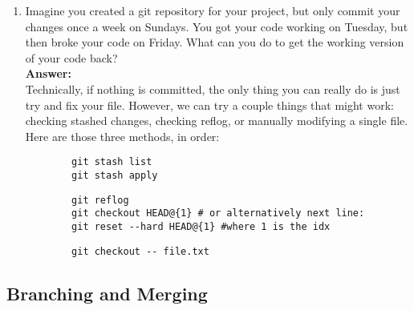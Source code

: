\documentclass[10pt,twocolumn]{article}
\begin{document}
\begin{enumerate}
\item Imagine you created a git repository for your project, but only commit your changes once a week on Sundays. You got your code working on Tuesday, but then broke your code on Friday. What can you do to get the working version of your code back?\\
    \textbf{Answer:}\\
    Technically, if nothing is committed, the only thing you can really do is just try and fix your file. However, we can try a couple things that might work: checking stashed changes, checking reflog, or manually modifying a single file. Here are those three methods, in order:
    \begin{verbatim}
        git stash list
        git stash apply 
    \end{verbatim}
    \begin{verbatim}
        git reflog
        git checkout HEAD@{1} # or alternatively next line:
        git reset --hard HEAD@{1} #where 1 is the idx
    \end{verbatim}
    \begin{verbatim}
        git checkout -- file.txt
    \end{verbatim}

\end{enumerate}

\subsection{Branching and Merging}
\end{document}
